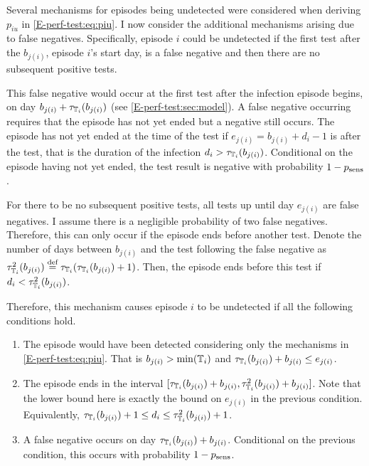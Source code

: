 \documentclass[thesis.tex]{subfiles}
\begin{document}
Several mechanisms for episodes being undetected were considered when deriving $p_{iu}$ in \cref{E-perf-test:eq:piu}.
I now consider the additional mechanisms arising due to false negatives.
Specifically, episode $i$ could be undetected if the first test after the $b_{j(i)}$, episode $i$'s start day, is a false negative and then there are no subsequent positive tests.

This false negative would occur at the first test after the infection episode begins, on day $b_{j(i)} + \tau_{\mathbb{T}_i}(b_{j(i)})$ (see \cref{E-perf-test:sec:model}).
A false negative occurring requires that the episode has not yet ended but a negative still occurs.
The episode has not yet ended at the time of the test if $e_{j(i)} = b_{j(i)} + d_i - 1$ is after the test, that is the duration of the infection $d_i > \tau_{\mathbb{T}_i}(b_{j(i)})$.
Conditional on the episode having not yet ended, the test result is negative with probability $1 - p_\text{sens}$.

For there to be no subsequent positive tests, all tests up until day $e_{j(i)}$ are false negatives.
I assume there is a negligible probability of two false negatives.
Therefore, this can only occur if the episode ends before another test.
Denote the number of days between $b_{j(i)}$ and the test following the false negative as $\tau^2_{\mathbb{T}_i}(b_{j(i)}) \stackrel{\text{def}}{=} \tau_{\mathbb{T}_i}(\tau_{\mathbb{T}_i}(b_{j(i)}) + 1)$.
Then, the episode ends before this test if $d_i < \tau^2_{\mathbb{T}_i}(b_{j(i)})$.

Therefore, this mechanism causes episode $i$ to be undetected if all the following conditions hold.
\begin{enumerate}
    \item The episode would have been detected considering only the mechanisms in \cref{E-perf-test:eq:piu}. That is $b_{j(i)} > \min(\mathbb{T}_i)$ and $\tau_{\mathbb{T}_i}(b_{j(i)}) + b_{j(i)} \leq e_{j(i)}$.
    \item The episode ends in the interval $[\tau_{\mathbb{T}_i}(b_{j(i)}) + b_{j(i)}, \tau^2_{\mathbb{T}_i}(b_{j(i)}) + b_{j(i)}]$.
      Note that the lower bound here is exactly the bound on $e_{j(i)}$ in the previous condition.
      Equivalently, $\tau_{\mathbb{T}_i}(b_{j(i)}) + 1 \leq d_i \leq \tau^2_{\mathbb{T}_i}(b_{j(i)}) + 1$.
    \item A false negative occurs on day $\tau_{\mathbb{T}_i}(b_{j(i)}) + b_{j(i)}$. Conditional on the previous condition, this occurs with probability $1 - p_\text{sens}$.
\end{enumerate}
\end{document}
